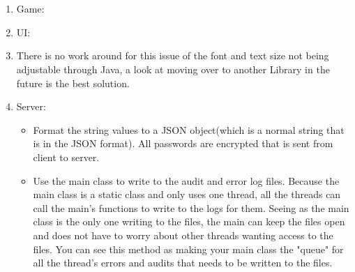 \documentclass[letterpaper]{article}
\begin{document}
		\vspace{0.2in}
		\section*{\colorbox{black}{}}
		\vspace{0.1in}	
			
			\begin{enumerate}
				\item Game:
				
				\item UI: \item There is no work around for this issue of the font and text size not being adjustable through Java, a look at moving over to another Library in the future is the best solution.
				
				\item Server:
					\begin{itemize}
						\item Format the string values to a JSON object(which is a normal string that is in the JSON format). All passwords are encrypted that is sent from client to server.
					\end{itemize}
					\begin{itemize}
						\item Use the main class to write to the audit and error log files. Because the main class is a static class and only uses one thread, all the threads can call the main's functions to write to the logs for them. Seeing as the main class is the only one writing to the files, the main can keep the files open and does not have to worry about other threads wanting access to the files. You can see this method as making your main class the "queue" for all the thread's errors and audits that needs to be written to the files. 
					\end{itemize}
			\end{enumerate}
				
		\vspace{0.2in}
		\section*{\colorbox{black}{}}
		\vspace{0.1in}
			
\end{document}
